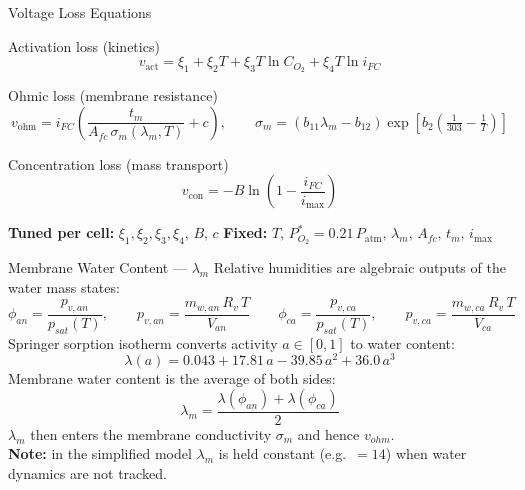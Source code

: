 \documentclass[aspectratio=169]{beamer}
\begin{document}
\begin{frame}{Voltage Loss Equations}
    \begin{block}{Activation loss (kinetics)}
        \[
            v_\text{act} = \xi_1 + \xi_2 T + \xi_3 T\ln C_{O_2} + \xi_4 T\ln i_{FC}
        \]
    \end{block}
    \begin{block}{Ohmic loss (membrane resistance)}
        \[
            v_\text{ohm} = i_{FC}\!\left(\frac{t_m}{A_{fc}\,\sigma_m(\lambda_m, T)} + c\right),
            \qquad
            \sigma_m = (b_{11}\lambda_m - b_{12})\exp\!\left[b_2\!\left(\tfrac{1}{303}-\tfrac{1}{T}\right)\right]
        \]
    \end{block}
    \begin{block}{Concentration loss (mass transport)}
        \[
            v_\text{con} = -B\ln\!\left(1 - \frac{i_{FC}}{i_\text{max}}\right)
        \]
    \end{block}
    \textbf{Tuned per cell:} $\xi_1,\xi_2,\xi_3,\xi_4,\,B,\,c$ \quad
    \textbf{Fixed:} $T,\,P_{O_2}^*{=}0.21\,P_\text{atm},\,\lambda_m,\,A_{fc},\,t_m,\,i_\text{max}$
\end{frame}

\begin{frame}{Membrane Water Content — $\lambda_m$}
    Relative humidities are algebraic outputs of the water mass states:
    \[
        \phi_{an} = \frac{p_{v,an}}{p_{sat}(T)}, \qquad p_{v,an} = \frac{m_{w,an}\,R_v\,T}{V_{an}}
        \qquad
        \phi_{ca} = \frac{p_{v,ca}}{p_{sat}(T)}, \qquad p_{v,ca} = \frac{m_{w,ca}\,R_v\,T}{V_{ca}}
    \]
    Springer sorption isotherm converts activity $a\in[0,1]$ to water content:
    \[
        \lambda(a) = 0.043 + 17.81\,a - 39.85\,a^2 + 36.0\,a^3
    \]
    Membrane water content is the average of both sides:
    \[
        \lambda_m = \frac{\lambda(\phi_{an}) + \lambda(\phi_{ca})}{2}
    \]
    $\lambda_m$ then enters the membrane conductivity $\sigma_m$ and hence $v_{ohm}$.\\
    \textbf{Note:} in the simplified model $\lambda_m$ is held constant (e.g.\ $=14$) when water dynamics are not tracked.
\end{frame}
\end{document}
